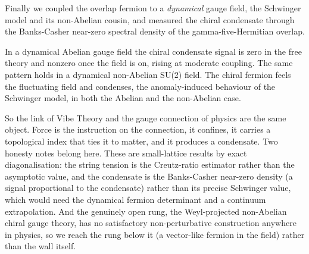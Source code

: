 Finally we coupled the overlap fermion to a \emph{dynamical} gauge field, the Schwinger model and its non-Abelian cousin, and measured the chiral condensate through the Banks-Casher near-zero spectral density of the gamma-five-Hermitian overlap.

\begin{result}
In a dynamical Abelian gauge field the chiral condensate signal is zero in the free theory and nonzero once the field is on, rising at moderate coupling. The same pattern holds in a dynamical non-Abelian SU(2) field. The chiral fermion feels the fluctuating field and condenses, the anomaly-induced behaviour of the Schwinger model, in both the Abelian and the non-Abelian case.
\end{result}

So the link of Vibe Theory and the gauge connection of physics are the same object. Force is the instruction on the connection, it confines, it carries a topological index that ties it to matter, and it produces a condensate. Two honesty notes belong here. These are small-lattice results by exact diagonalisation: the string tension is the Creutz-ratio estimator rather than the asymptotic value, and the condensate is the Banks-Casher near-zero density (a signal proportional to the condensate) rather than its precise Schwinger value, which would need the dynamical fermion determinant and a continuum extrapolation. And the genuinely open rung, the Weyl-projected non-Abelian chiral gauge theory, has no satisfactory non-perturbative construction anywhere in physics, so we reach the rung below it (a vector-like fermion in the field) rather than the wall itself.
